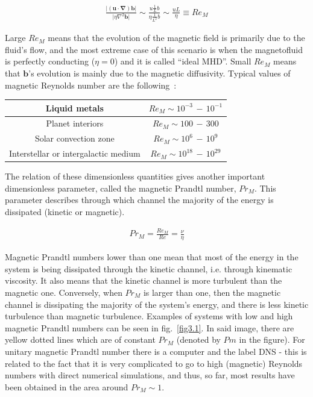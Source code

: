 \documentclass[12pt,a4paper]{report}
\begin{document}
\begin{align}
 \frac{\vert (\bm u \cdot \bm \nabla) \bm b \vert}{\vert \eta \nabla^2 \bm b \vert} \sim \frac{u \frac{1}{L} b}{\eta \frac{1}{L^2} b} \sim \frac{u L}{\eta} \equiv Re_M \nonumber
\end{align}

Large $Re_M$ means that the evolution of the magnetic field is primarily due to the fluid's flow, and the most extreme case of this scenario is when the magnetofluid is perfectly conducting ($\eta = 0$) and it is called ``ideal MHD''. Small $Re_M$ means that $\bm b$'s evolution is mainly due to the magnetic diffusivity. Typical values of magnetic Reynolds number are the following~\cite{LinkmannMoritzFrederikLeon2016Spim}:

\begin{center}
\begin{tabular}{| c | c |}
 \hline
 Liquid metals & $Re_M \sim 10^{-3}\,-\,10^{-1}$ \\ 
 \hline
 Planet interiors & $Re_M \sim 100\,-\,300$ \\ 
 \hline
 Solar convection zone & $Re_M \sim 10^{6}\,-\,10^{9}$ \\ 
 \hline
 Interstellar or intergalactic medium & $Re_M \sim 10^{18}\,-\,10^{29}$ \\ 
 \hline
\end{tabular}
\end{center}

The relation of these dimensionless quantities gives another important dimensionless parameter, called the magnetic Prandtl number, $Pr_M$. This parameter describes through which channel the majority of the energy is dissipated (kinetic or magnetic).

\begin{align}
 Pr_M = \frac{Re_M}{Re} = \frac{\nu}{\eta} \nonumber
\end{align}

Magnetic Prandtl numbers lower than one mean that most of the energy in the system is being dissipated through the kinetic channel, i.e. through kinematic viscosity. It also means that the kinetic channel is more turbulent than the magnetic one. Conversely, when $Pr_M$ is larger than one, then the magnetic channel is dissipating the majority of the system's energy, and there is less kinetic turbulence than magnetic turbulence. Examples of systems with low and high magnetic Prandtl numbers can be seen in fig.~\ref{fig3.1}. In said image, there are yellow dotted lines which are of constant $Pr_M$ (denoted by $Pm$ in the figure). For unitary magnetic Prandtl number there is a computer and the label DNS - this is related to the fact that it is very complicated to go to high (magnetic) Reynolds numbers with direct numerical simulations, and thus, so far, most results have been obtained in the area around $Pr_M \sim 1$. 
\end{document}

